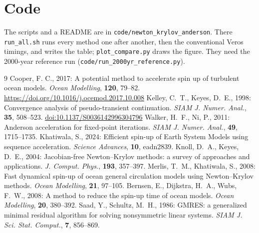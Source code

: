 \documentclass{article}
\begin{document}
\section*{Code}

The scripts and a README are in \texttt{code/newton\_krylov\_anderson}. There \texttt{run\_all.sh} runs every method one after another, then the conventional Veros timings, and writes the table; \texttt{plot\_compare.py} draws the figure. They need the 2000-year reference run (\texttt{code/run\_2000yr\_reference.py}).

\begin{thebibliography}{9}
 Cooper, F. C., 2017: A potential method to accelerate spin up of turbulent ocean models. \textit{Ocean Modelling}, \textbf{120}, 79--82. \url{https://doi.org/10.1016/j.ocemod.2017.10.008}
 Kelley, C.~T., Keyes, D.~E., 1998: Convergence analysis of pseudo-transient continuation. \textit{SIAM J. Numer. Anal.}, \textbf{35}, 508--523. \href{https://doi.org/10.1137/S0036142996304796}{doi:10.1137/S0036142996304796}
 Walker, H.~F., Ni, P., 2011: Anderson acceleration for fixed-point iterations. \textit{SIAM J. Numer. Anal.}, \textbf{49}, 1715--1735.
 Khatiwala, S., 2024: Efficient spin-up of Earth System Models using sequence acceleration. \textit{Science Advances}, \textbf{10}, eadn2839.
 Knoll, D.~A., Keyes, D.~E., 2004: Jacobian-free Newton--Krylov methods: a survey of approaches and applications. \textit{J. Comput. Phys.}, \textbf{193}, 357--397.
 Merlis, T.~M., Khatiwala, S., 2008: Fast dynamical spin-up of ocean general circulation models using Newton--Krylov methods. \textit{Ocean Modelling}, \textbf{21}, 97--105.
 Bernsen, E., Dijkstra, H.~A., Wubs, F.~W., 2008: A method to reduce the spin-up time of ocean models. \textit{Ocean Modelling}, \textbf{20}, 380--392.
 Saad, Y., Schultz, M.~H., 1986: GMRES: a generalized minimal residual algorithm for solving nonsymmetric linear systems. \textit{SIAM J. Sci. Stat. Comput.}, \textbf{7}, 856--869.
\end{thebibliography}
\end{document}
